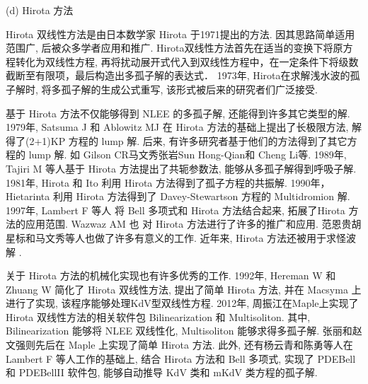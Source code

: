 (d) Hirota 方法

Hirota 双线性方法是由日本数学家 Hirota 于1971提出的方法\cite{hirota1971exact}. 因其思路简单\D 适用范围广, 后被众多学者应用和推广. Hirota双线性方法首先在适当的变换下将原方程转化为双线性方程, 再将扰动展开式代入到双线性方程中，在一定条件下将级数截断至有限项，最后构造出多孤子解的表达式． 1973年, Hirota\cite{hirota1973exact}在求解浅水波的孤子解时, 将多孤子解的生成公式重写, 该形式被后来的研究者们广泛接受. 

基于 Hirota 方法不仅能够得到 NLEE 的多孤子解, 还能得到许多其它类型的解. 1979年, Satsuma J 和 Ablowitz MJ \cite{satsuma1979two} 在 Hirota 方法的基础上提出了长极限方法, 解得了(2+1)KP 方程\cite{kadomtsev1970stability}的 lump 解. 后来, 有许多研究者基于他们的方法得到了其它方程的 lump 解. 如 Gilson CR\cite{gilson1990lump}\D 马文秀\cite{ma2015lump,zhang2017lump,chen2018lump}\D 张岩\cite{zhangYTSF,zhang2018m}\D Sun Hong-Qian\cite{sun2017lump}\D 和 Cheng Li\cite{cheng2017lump}等. 1989年, Tajiri M 等人\cite{tajiri1989breather}基于 Hirota 方法提出了共轭参数法, 能够从多孤子解得到呼吸子解. 1981年, Hirota 和 Ito \cite{hirota1983resonance}利用 Hirota 方法得到了孤子方程的共振解. 1990年， Hietarinta \cite{hietarinta1990multidromion}利用 Hirota 方法得到了 Davey-Stewartson 方程的 Multidromion 解. 1997年, Lambert F 等人\cite{gilson1996combinatorics,lambert1997construction,lambert2008soliton} 将 Bell 多项式和 Hirota 方法结合起来, 拓展了Hirota 方法的应用范围. Wazwaz AM 也\cite{wazwaz2008multiple,wazwaz2008integrable,wazwaz2009multiple,wazwaz20102,wazwaz2010multiple,wazwaz2012multiple} 对 Hirota 方法进行了许多的推广和应用. 范恩贵\cite{fan2011new}\D 胡星标\cite{hu1999soliton,hu2002application,hirota2003vector}和马文秀\cite{ma2011linear}等人也做了许多有意义的工作. 近年来, Hirota 方法还被用于求怪波解 \cite{guo2011rogue,sun2018general,zhaqilao2018symbolic}.

关于 Hirota 方法的机械化实现也有许多优秀的工作. 1992年, Hereman W 和 Zhuang W \cite{hereman1992symbolic,hereman1991macsyma} 简化了 Hirota 双线性方法, 提出了简单 Hirota 方法, 并在 Macsyma 上进行了实现, 该程序能够处理KdV型双线性方程. 2012年, 周振江\cite{zhou2012}在Maple上实现了 Hirota 双线性方法的相关软件包 Bilinearization 和 Multisoliton. 其中, Bilinearization 能够将 NLEE 双线性化, Multisoliton 能够求得多孤子解. 张丽\cite{zhang2014}和赵文强\cite{zwq2016}则先后在 Maple 上实现了简单 Hirota 方法. 此外, 还有杨云青和陈勇等人\cite{yang2011,miao2014pdebellii}在 Lambert F 等人工作的基础上, 结合 Hirota 方法和 Bell 多项式, 实现了 PDEBell 和 PDEBellII 软件包, 能够自动推导 KdV 类和 mKdV 类方程的孤子解. 


